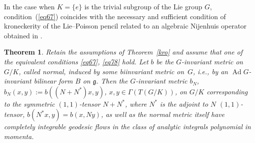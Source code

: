 \documentclass[pdftex]{sigma}
\numberwithin{equation}{section}
\newtheorem{Theorem}{Theorem}[section]
\begin{document}
\begin{Remark}\label{remarr} In the case when $K=\{e\}$ is the trivial subgroup of the Lie group $G$, condition~(\ref{eq67}) coincides with the necessary and sufficient condition of kroneckerity of the Lie--Poisson pencil related to an algebraic Nijenhuis operator obtained in \cite[Theorem~2.5]{p5}.
\end{Remark}

\begin{Theorem}\label{thgeod} Retain the assumptions of Theorem~{\rm \ref{kro}} and assume that one of the equivalent conditions \eqref{eq67}, \eqref{eq78} hold. Let $b$ be the $G$-invariant metric on $G/K$, called {\em normal}, induced by some biinvariant metric on~$G$, i.e., by an $\operatorname{Ad} G$-invariant bilinear form $B$ on $\mathfrak{g}$. Then the $G$-invariant metric $b_N$, $b_N(x,y):=b((N+N^*)x,y)$, $x,y\in \Gamma(T(G/K))$, on $G/K$ corresponding to the symmetric $(1,1)$-tensor $N+N^*$, where $N^*$ is the adjoint to $N$ $(1,1)$-tensor, $b(N^*x,y)=b(x,Ny)$, as well as the normal metric itself have completely integrable geodesic flows in the class of analytic integrals polynomial in momenta.
\end{Theorem}
\end{document}
